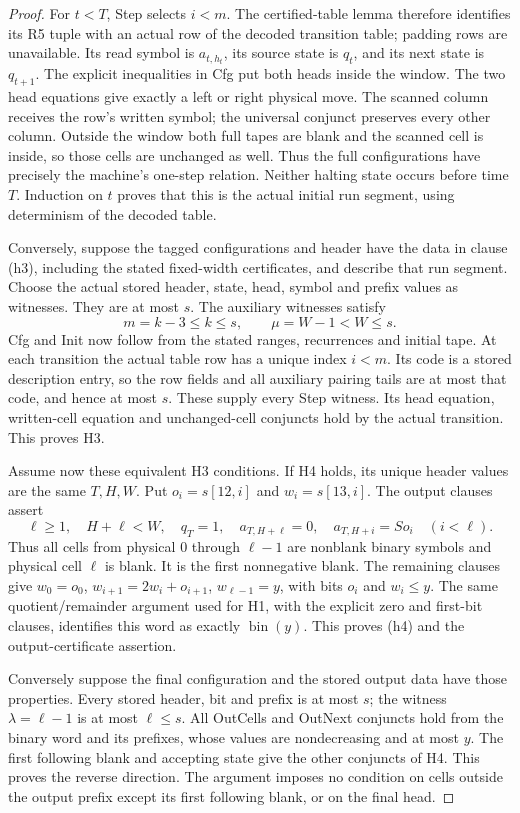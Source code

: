 \begin{proof}
For \(t<T\), Step selects \(i<m\).  The certified-table lemma
therefore identifies its R5 tuple with an actual row of the decoded
transition table; padding rows are unavailable.  Its read symbol
is \(a_{t,h_t}\), its source state is \(q_t\), and its next state
is \(q_{t+1}\).  The explicit inequalities in Cfg put both heads
inside the window.  The two head equations give exactly a left
or right physical move.  The scanned column receives the row's
written symbol; the universal conjunct preserves every other
column.  Outside the window both full tapes are blank and the
scanned cell is inside, so those cells are unchanged as well.
Thus the full configurations have precisely the machine's
one-step relation.  Neither halting state occurs before time \(T\).
Induction on \(t\) proves that this is the actual initial run
segment, using determinism of the decoded table.

Conversely, suppose the tagged configurations and header have the
data in clause (h3), including the stated fixed-width certificates,
and describe that run segment.  Choose the actual stored header,
state, head, symbol and prefix values as witnesses.  They are at
most \(s\).  The auxiliary witnesses satisfy
\[
 m=k-3\leq k\leq s,\qquad \mu=W-1<W\leq s.
\]
Cfg and Init now follow from the stated ranges, recurrences and
initial tape.  At each transition the actual table row has a
unique index \(i<m\).  Its code is a stored description entry,
so the row fields and all auxiliary pairing tails are at most
that code, and hence at most \(s\).  These supply every Step
witness.  Its head equation, written-cell equation and unchanged-cell
conjuncts hold by the actual transition.  This proves H3.

Assume now these equivalent H3 conditions.  If H4 holds, its unique
header values are the same \(T,H,W\).  Put \(o_i=s[12,i]\) and
\(w_i=s[13,i]\).  The output clauses assert
\[
 \ell\geq1,\quad H+\ell<W,\quad q_T=1,\quad
 a_{T,H+\ell}=0,\quad a_{T,H+i}=So_i\quad(i<\ell).
\]
Thus all cells from physical \(0\) through \(\ell-1\) are
nonblank binary symbols and physical cell \(\ell\) is blank.
It is the first nonnegative blank.  The remaining clauses give
\(w_0=o_0\), \(w_{i+1}=2w_i+o_{i+1}\), \(w_{\ell-1}=y\),
with bits \(o_i\) and \(w_i\leq y\).  The same quotient/remainder
argument used for H1, with the explicit zero and first-bit clauses,
identifies this word as exactly \(\operatorname{bin}(y)\).
This proves (h4) and the output-certificate assertion.

Conversely suppose the final configuration and the stored output
data have those properties.  Every stored header, bit and prefix
is at most \(s\); the witness \(\lambda=\ell-1\) is at most
\(\ell\leq s\).  All OutCells and OutNext conjuncts hold from
the binary word and its prefixes, whose values are nondecreasing
and at most \(y\).  The first following blank and accepting state
give the other conjuncts of H4.  This proves the reverse direction.
The argument imposes no condition on cells outside the output prefix
except its first following blank, or on the final head.
\end{proof}

